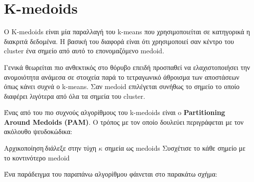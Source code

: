\section{Κ-medoids}
Ο K-medoids είναι μία παραλλαγή του k-means που χρησιμοποιείται σε κατηγορικά η διακριτά δεδομένα.
Η βασική του διαφορά είναι ότι χρησιμοποιεί σαν κέντρο του cluster ένα σημείο από αυτό το επονομαζόμενο medoid.

Γενικά θεωρείται πιο ανθεκτικός στο θόρυβο επειδή προσπαθεί να ελαχιστοποιήσει την ανομοιότητα ανάμεσα σε στοιχεία παρά το τετραγωνικό άθροισμα των αποστάσεων όπως κάνει συχνά ο k-means.
Σαν medoid επιλέγεται συνήθως το σημείο το οποίο διαφέρει λιγότερα από όλα τα σημεία του cluster.

Ένας από του πιο συχνούς αλγορίθμους του k-medoids είναι o \textbf{Partitioning Around Medoids (PAM)}.
Ο τρόπος με τον οποίο δουλεύει
περιγράφεται με τον ακόλουθο ψευδοκώδικα:\\
\begin{algorithm}[H]
    Αρχικοποίηση$\:$διάλεξε στην τύχη $\kappa$ σημεία ως medoids\;
    Συσχέτισε το κάθε σημείο με το κοντινότερο medoid\;
\end{algorithm}

Ένα παράδειγμα του παραπάνω αλγορίθμου φάινεται στο παρακάτω σχήμα:\\
\noindent\begin{minipage}{\linewidth}
    \centering
	\label{fig:pam}
\end{minipage}
